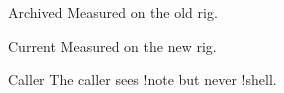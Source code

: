 

\begin{frame}{Archived}
{%
\small
Measured on the old rig.
}
\end{frame}

\begin{frame}{Current}
{%
\footnotesize\color{gray}
Measured on the new rig.
}
\end{frame}

\begin{frame}{Caller}
{%
\footnotesize\color{gray}
The caller sees !note but never !shell.
}
\end{frame}
